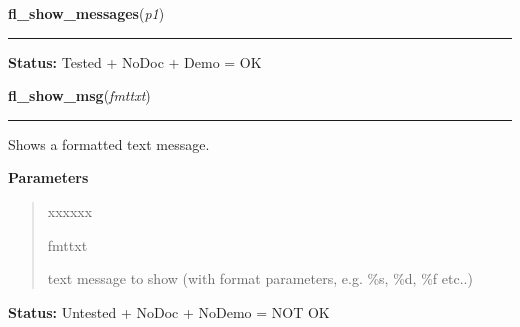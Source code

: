     \label{xformslib:flgoodies:fl_show_messages}

    \vspace{0.5ex}

\hspace{.8\funcindent}\begin{boxedminipage}{\funcwidth}

    \raggedright \textbf{fl\_show\_messages}(\textit{p1})

    \vspace{-1.5ex}

    \rule{\textwidth}{0.5\fboxrule}
\setlength{\parskip}{2ex}
\setlength{\parskip}{1ex}
\textbf{Status:} Tested + NoDoc + Demo = OK



    \end{boxedminipage}

    \label{xformslib:flgoodies:fl_show_msg}

    \vspace{0.5ex}

\hspace{.8\funcindent}\begin{boxedminipage}{\funcwidth}

    \raggedright \textbf{fl\_show\_msg}(\textit{fmttxt})

    \vspace{-1.5ex}

    \rule{\textwidth}{0.5\fboxrule}
\setlength{\parskip}{2ex}
    Shows a formatted text message.

\setlength{\parskip}{1ex}
      \textbf{Parameters}
      \vspace{-1ex}

      \begin{quote}
        \begin{Ventry}{xxxxxx}

          \item[fmttxt]

          text message to show (with format parameters, e.g. \%s, \%d, \%f 
          etc..)

        \end{Ventry}

      \end{quote}

\textbf{Status:} Untested + NoDoc + NoDemo = NOT OK



    \end{boxedminipage}


